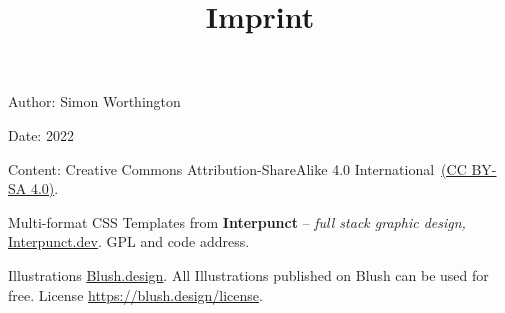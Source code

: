 \documentclass{article}
\begin{document}
\title{Imprint}

\maketitle


\subsection{}\label{H8275517}






Author: Simon Worthington


Date: 2022


Content: Creative Commons Attribution-ShareAlike 4.0 International \href{https://creativecommons.org/licenses/by-sa/4.0/}{(CC BY-SA 4.0)}.


Multi-format CSS Templates from \textbf{Interpunct} – \emph{full stack graphic design,} \href{https://interpunct.dev/}{Interpunct.dev}. GPL and code address.


Illustrations \href{https://blush.design/}{Blush.design}. All Illustrations published on Blush can be used for free. License \href{https://blush.design/license}{https://blush.design/license}.
\end{document}
